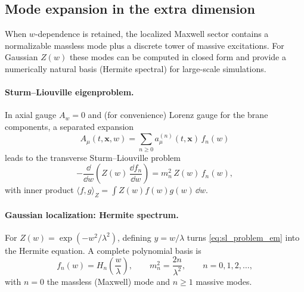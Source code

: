 \documentclass[11pt]{article}
\newcommand{\x}{\mathbf{x}}     %
\newcommand{\A}{A}              %
\newcommand{\Z}{Z}              %
\begin{document}
\subsection{Mode expansion in the extra dimension}
\label{sec:kk_modes_em}

When \(w\)-dependence is retained, the localized Maxwell sector contains a
normalizable massless mode plus a discrete tower of massive excitations. For
Gaussian \(\Z(w)\) these modes can be computed in closed form and provide a
numerically natural basis (Hermite spectral) for large-scale simulations.

\paragraph{Sturm--Liouville eigenproblem.}
In axial gauge \(A_w=0\) and (for convenience) Lorenz gauge for the brane
components, a separated expansion
\begin{equation}
\A_\mu(t,\x,w)=\sum_{n\ge 0} a_\mu^{(n)}(t,\x)\,f_n(w)
\label{eq:kk_expansion_em}
\end{equation}
leads to the transverse Sturm--Liouville problem
\begin{equation}
-\frac{\dd}{\dd w}\!\left(\Z(w)\,\frac{\dd f_n}{\dd w}\right)
= m_n^2\,\Z(w)\,f_n(w),
\label{eq:sl_problem_em}
\end{equation}
with inner product \(\langle f,g\rangle_{\Z}=\int \Z(w)f(w)g(w)\,\dd w\).

\paragraph{Gaussian localization: Hermite spectrum.}
For \(\Z(w)=\exp(-w^2/\lambda^2)\), defining \(y=w/\lambda\) turns
\eqref{eq:sl_problem_em} into the Hermite equation. A complete polynomial basis is
\begin{equation}
f_n(w)=H_n\!\left(\frac{w}{\lambda}\right),
\qquad
m_n^2=\frac{2n}{\lambda^2},
\qquad n=0,1,2,\ldots,
\label{eq:hermite_spectrum_em}
\end{equation}
with \(n=0\) the massless (Maxwell) mode and \(n\ge 1\) massive modes.
\end{document}
